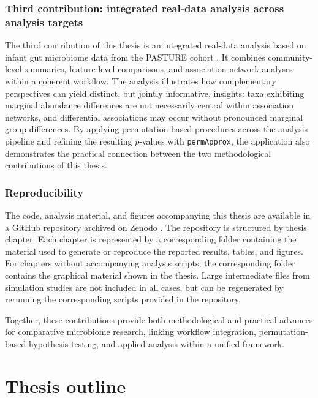 \subsubsection*{Third contribution: integrated real-data analysis across analysis targets}
The third contribution of this thesis is an integrated real-data analysis based on infant gut microbiome data from the PASTURE cohort \citep{vonmutius2006pasture}. It combines community-level summaries, feature-level comparisons, and association-network analyses within a coherent workflow. The analysis illustrates how complementary perspectives can yield distinct, but jointly informative, insights: taxa exhibiting marginal abundance differences are not necessarily central within association networks, and differential associations may occur without pronounced marginal group differences. By applying permutation-based procedures across the analysis pipeline and refining the resulting $p$-values with \texttt{permApprox}, the application also demonstrates the practical connection between the two methodological contributions of this thesis.

\subsubsection*{Reproducibility}
The code, analysis material, and figures accompanying this thesis are available in a GitHub repository archived on Zenodo \citep{Peschel2026thesisRepo}. The repository is structured by thesis chapter. Each chapter is represented by a corresponding folder containing the material used to generate or reproduce the reported results, tables, and figures. For chapters without accompanying analysis scripts, the corresponding folder contains the graphical material shown in the thesis. Large intermediate files from simulation studies are not included in all cases, but can be regenerated by rerunning the corresponding scripts provided in the repository.

Together, these contributions provide both methodological and practical advances for comparative microbiome research, linking workflow integration, permutation-based hypothesis testing, and applied analysis within a unified framework.

\section{Thesis outline}
\label{sec:intro:structure}

